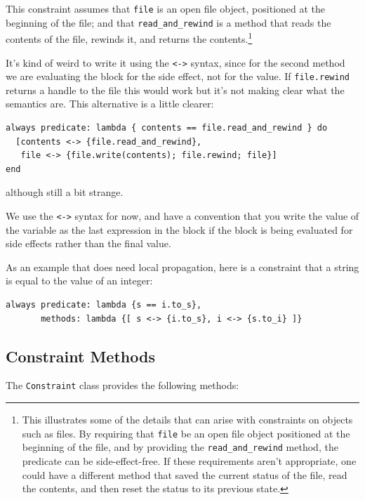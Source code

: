 \documentclass[11pt]{article}
\begin{document}
This constraint assumes that \lstinline{file} is an open file object,
positioned at the beginning of the file; and that
\lstinline{read_and_rewind} is a method that reads the contents of the
file, rewinds it, and returns the contents.\footnote{This illustrates
  some of the details that can arise with constraints on objects such
  as files.  By requiring that \lstinline{file} be an open file object
  positioned at the beginning of the file, and by providing the
  \lstinline{read_and_rewind} method, the predicate can be
  side-effect-free.  If these requirements aren't appropriate, one
  could have a different method that saved the current status of the
  file, read the contents, and then reset the status to its previous
  state.}

It's kind of weird to write it using the \lstinline{<->} syntax, since
for the second method we are evaluating the block for the side effect,
not for the value. If \lstinline{file.rewind} returns a handle to the
file this would work but it's not making clear what the semantics are.
This alternative is a little clearer:

\begin{lstlisting}
always predicate: lambda { contents == file.read_and_rewind } do
  [contents <-> {file.read_and_rewind},
   file <-> {file.write(contents); file.rewind; file}]
end
\end{lstlisting}

although still a bit strange.

We use the \lstinline{<->} syntax for now, and have a convention that
you write the value of the variable as the last expression in the
block if the block is being evaluated for side effects rather than the
final value.

As an example that does need local propagation, here is a constraint
that a string is equal to the value of an integer:
\begin{lstlisting}
always predicate: lambda {s == i.to_s},
       methods: lambda {[ s <-> {i.to_s}, i <-> {s.to_i} ]}
\end{lstlisting}

\subsection{Constraint Methods}

The \lstinline{Constraint} class provides the following methods:
\end{document}
